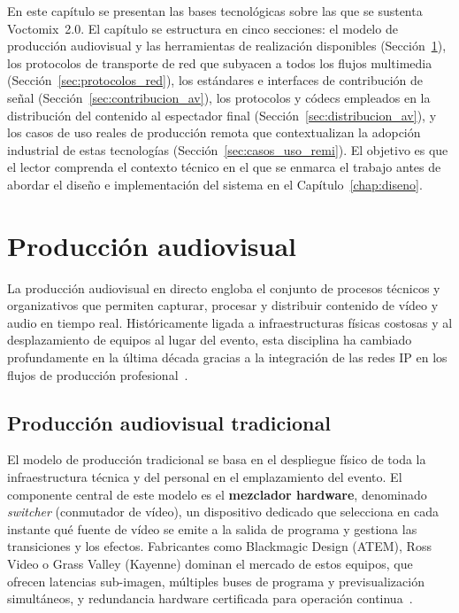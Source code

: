 En este capítulo se presentan las bases tecnológicas sobre las que se sustenta
Voctomix~2.0. El capítulo se estructura en cinco secciones: el modelo de producción
audiovisual y las herramientas de realización disponibles
(Sección~\ref{sec:produccion_av}), los protocolos de transporte de red que subyacen
a todos los flujos multimedia (Sección~\ref{sec:protocolos_red}), los estándares e
interfaces de contribución de señal (Sección~\ref{sec:contribucion_av}), los protocolos
y códecs empleados en la distribución del contenido al espectador final
(Sección~\ref{sec:distribucion_av}), y los casos de uso reales de producción remota que
contextualizan la adopción industrial de estas tecnologías
(Sección~\ref{sec:casos_uso_remi}). El objetivo es que el lector comprenda el contexto
técnico en el que se enmarca el trabajo antes de abordar el diseño e implementación del
sistema en el Capítulo~\ref{chap:diseno}.

\section{Producción audiovisual}
\label{sec:produccion_av}

La producción audiovisual en directo engloba el conjunto de procesos técnicos y
organizativos que permiten capturar, procesar y distribuir contenido de vídeo y audio
en tiempo real. Históricamente ligada a infraestructuras físicas costosas y al desplazamiento de
equipos al lugar del evento, esta disciplina ha cambiado profundamente en la última
década gracias a la integración de las redes IP en los flujos de producción
profesional~\cite{tmbroadcast_remi}.

\subsection{Producción audiovisual tradicional}

El modelo de producción tradicional se basa en el despliegue físico de toda la
infraestructura técnica y del personal en el emplazamiento del evento. El componente
central de este modelo es el \textbf{mezclador hardware}, denominado
\textit{switcher} (conmutador de vídeo), un dispositivo dedicado que selecciona en cada instante qué fuente
de vídeo se emite a la salida de programa y gestiona las transiciones y los efectos.
Fabricantes como Blackmagic Design (ATEM), Ross Video o Grass Valley (Kayenne) dominan
el mercado de estos equipos, que ofrecen latencias sub-imagen, múltiples buses de
programa y previsualización simultáneos, y redundancia hardware certificada para
operación continua~\cite{blackmagic_atem}.

